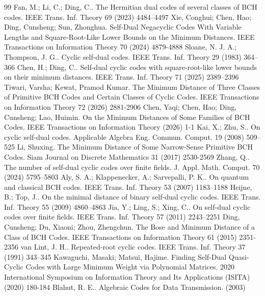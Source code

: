 \documentclass[10pt,a4paper]{amsart}
\begin{document}
\begin{thebibliography}{99}
 Fan, M.; Li, C.; Ding, C.. The {Hermitian} dual codes of several classes of {BCH} codes. IEEE Trans. Inf. Theory 69 (2023) 4484--4497
 Xie, Conghui; Chen, Hao; Ding, Cunsheng; Sun, Zhonghua. Self-Dual Negacyclic Codes With Variable Lengths and Square-Root-Like Lower Bounds on the Minimum Distances. IEEE Transactions on Information Theory 70 (2024) 4879-4888
 Sloane, N. J. A.; Thompson, J. G.. Cyclic self-dual codes. IEEE Trans. Inf. Theory 29 (1983) 364--366
 Chen, H.; Ding, C.. Self-dual cyclic codes with square-root-like lower bounds on their minimum distances. IEEE Trans. Inf. Theory 71 (2025) 2389--2396
 Tiwari, Varsha; Kewat, Pramod Kumar. The Minimum Distance of Three Classes of Primitive {BCH} Codes and Certain Classes of Cyclic Codes. IEEE Transactions on Information Theory 72 (2026) 2881-2906
 Chen, Yaqi; Chen, Hao; Ding, Cunsheng; Lao, Huimin. On the Minimum Distances of Some Families of {BCH} Codes. IEEE Transactions on Information Theory (2026) 1-1
 Kai, X.; Zhu, S.. On cyclic self-dual codes. Applicable Algebra Eng. Commun. Comput. 19 (2008) 509--525
 Li, Shuxing. The Minimum Distance of Some Narrow-Sense Primitive {BCH} Codes. Siam Journal on Discrete Mathematics 31 (2017) 2530-2569
 Zhang, Q.. The number of self-dual cyclic codes over finite fields. J. Appl. Math. Comput. 70 (2024) 5795--5803
 Aly, S. A.; Klappenecker, A.; Sarvepalli, P. K.. On quantum and classical {BCH} codes. IEEE Trans. Inf. Theory 53 (2007) 1183--1188
 Heijne, B.; Top, J.. On the minimal distance of binary self-dual cyclic codes. IEEE Trans. Inf. Theory 55 (2009) 4860--4863
 Jia, Y.; Ling, S.; Xing, C.. On self-dual cyclic codes over finite fields. IEEE Trans. Inf. Theory 57 (2011) 2243--2251
 Ding, Cunsheng; Du, Xiaoni; Zhou, Zhengchun. The {B}ose and Minimum Distance of a Class of {BCH} Codes. IEEE Transactions on Information Theory 61 (2015) 2351-2356
 van Lint, J. H.. Repeated-root cyclic codes. IEEE Trans. Inf. Theory 37 (1991) 343--345
 Kawaguchi, Masaki; Matsui, Hajime. Finding Self-Dual Quasi-Cyclic Codes with Large Minimum Weight via Polynomial Matrices. 2020 International Symposium on Information Theory and Its Applications (ISITA) (2020) 180-184
 Blahut, R. E.. Algebraic Codes for Data Transmission. (2003)

\end{thebibliography}
\end{document}
